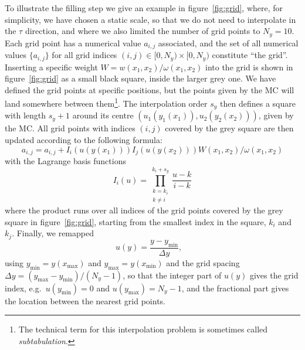 To illustrate the filling step we give an example in figure~\ref{fig:grid}, where, for simplicity, we have chosen a static scale, so that we do not need to interpolate in the $\tau$ direction, and where we also limited the number of grid points to $N_y = 10$.
Each grid point has a numerical value $a_{i,j}$ associated, and the set of all numerical values $\{ a_{i,j} \}$ for all grid indices $(i,j) \in [0,N_y) \times [0,N_y)$ constitute \enquote{the grid}.
Inserting a specific weight $W = w (x_1, x_2) / \omega(x_1, x_2)$ into the grid is shown in figure~\ref{fig:grid} as a small black square, inside the larger grey one.
We have defined the grid points at specific positions, but the points given by the MC will land somewhere between them\footnote{The technical term for this interpolation problem is sometimes called \emph{subtabulation}.}.
The interpolation order $s_y$ then defines a square with length $s_y + 1$ around its centre $(u_1(y_1(x_1)),u_2(y_2(x_2)))$, given by the MC.
All grid points with indices $(i,j)$ covered by the grey square are then updated according to the following formula:
\begin{equation}
a_{i,j} = a_{i,j} + I_i(u(y(x_1))) I_j(u(y(x_2))) W(x_1,x_2) / \omega(x_1,x_2)
\label{eq:interpolation}
\end{equation}
with the Lagrange basis functions
\begin{equation}
I_i (u) = \prod_{\substack{k=k_i \\ k \neq i}}^{k_i + s_y} \frac{u-k}{i-k}
\end{equation}
where the product runs over all indices of the grid points covered by the grey square in figure~\ref{fig:grid}, starting from the smallest index in the square, $k_i$ and $k_j$.
Finally, we remapped
\begin{equation}
u(y) = \frac{y-y_\text{min}}{\Delta y} \text{,} \quad
\end{equation}
using $y_\text{min} = y(x_\text{max})$ and $y_\text{max} = y(x_\text{min})$ and the grid spacing $\Delta y = (y_\text{max} - y_\text{min})/(N_y-1)$, so that the integer part of $u(y)$ gives the grid index, e.g.\ $u(y_\text{min}) = 0$ and $u(y_\text{max}) = N_y - 1$, and the fractional part gives the location between the nearest grid points.
